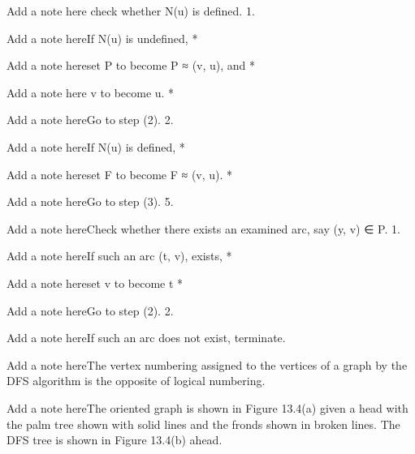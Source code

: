      Add a note here check whether N(u) is defined.
         1.

            Add a note hereIf N(u) is undefined,
                *

                  Add a note hereset P to become P ≈ {(v, u)}, and
                *

                  Add a note here v to become u.
                *

                  Add a note hereGo to step (2).
         2.

            Add a note hereIf N(u) is defined,
                *

                  Add a note hereset F to become F ≈ {(v, u)}.
                *

                  Add a note hereGo to step (3).
   5.

      Add a note hereCheck whether there exists an examined arc, say (y, v) ∈ P.
         1.

            Add a note hereIf such an arc (t, v), exists,
                *

                  Add a note hereset v to become t
                *

                  Add a note hereGo to step (2).
         2.

            Add a note hereIf such an arc does not exist, terminate.

Add a note hereThe vertex numbering assigned to the vertices of a graph by the DFS algorithm is the opposite of logical numbering.

Add a note hereThe oriented graph is shown in Figure 13.4(a) given a head with the palm tree shown with solid lines and the fronds shown in broken lines. The DFS tree is shown in Figure 13.4(b) ahead.
